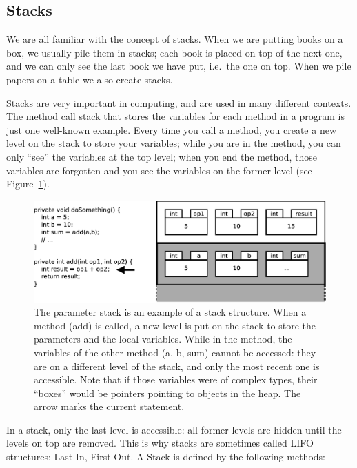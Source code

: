 \subsection{Stacks}
\label{sec:stacks}

We are all familiar with the concept of stacks. When we are putting
books on a box, we usually pile them in stacks; each book is placed 
on top of the
next one, and we can only see the last book we have put, i.e.~the one
on top. When we pile papers on a table we also create stacks. 

Stacks are very important in computing, and are used in many different
contexts. The method call stack that stores the variables for each
method in a program is just one well-known example. Every time you
call a method, you create a new level on the stack to store your
variables; while you are in the method, you can only ``see'' the
variables at the top level; when you end the method, those variables are
forgotten and you see the variables on the former level (see
Figure~\ref{fig:stackparameter}).  

\begin{figure}[bthp]
  \centering
  \includegraphics[width=\textwidth]{gfx/parameter-stack}
  \caption{The parameter stack is an example of a stack
    structure. When a method (add) is called, a new level is put on the
    stack to store the parameters and the local variables. While in
    the method, the variables of the other method (a, b, sum) cannot
    be accessed: they are on a different level of the stack, and only
    the most recent one is accessible. Note that if those variables
    were of complex types, their ``boxes'' would be pointers pointing
    to objects in the heap. The arrow marks the current statement.}
  \label{fig:stackparameter}
\end{figure}

In a stack, only the last level is accessible: all former levels are
hidden until the levels on top are removed. This is why stacks are
sometimes called LIFO structures: Last In, First Out. A Stack is
defined by the following methods:

